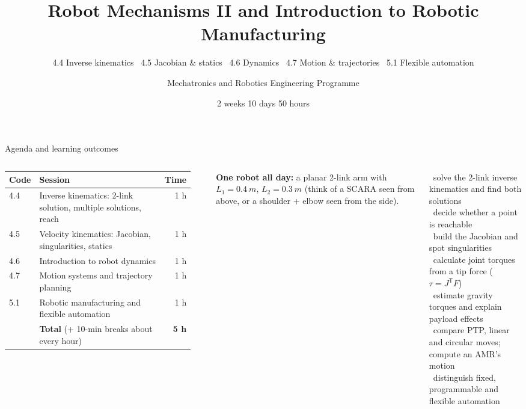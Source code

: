 \documentclass[aspectratio=169,10pt]{beamer}
\title[W2D2 -- IK, Jacobian, Dynamics, Motion, Automation]{Robot Mechanisms II and Introduction to Robotic Manufacturing}
\subtitle{4.4 Inverse kinematics \textbullet\ 4.5 Jacobian \& statics \textbullet\ 4.6 Dynamics \textbullet\ 4.7 Motion \& trajectories \textbullet\ 5.1 Flexible automation}
\author{Mechatronics and Robotics Engineering Programme}
\institute{Week 2 \textperiodcentered{} Day 2}
\date{2 weeks \textperiodcentered{} 10 days \textperiodcentered{} 50 hours}
\begin{document}
\begin{frame}[plain]\titlepage\end{frame}

\begin{frame}[t]{Agenda and learning outcomes}
\begin{columns}[T,onlytextwidth]
\footnotesize
\begin{tabularx}{\linewidth}{@{}l X r@{}}
\toprule
\textbf{Code} & \textbf{Session} & \textbf{Time}\\
\midrule
4.4 & Inverse kinematics: 2-link solution, multiple solutions, reach & 1 h\\
4.5 & Velocity kinematics: Jacobian, singularities, statics & 1 h\\
4.6 & Introduction to robot dynamics & 1 h\\
4.7 & Motion systems and trajectory planning & 1 h\\
5.1 & Robotic manufacturing and flexible automation & 1 h\\
\midrule
 & \textbf{Total} (+ 10-min breaks about every hour) & \textbf{5 h}\\
\bottomrule
\end{tabularx}\\[2mm]
\begin{notebox}
\textbf{One robot all day:} a planar 2-link arm with $L_1=\SI{0.4}{m}$, $L_2=\SI{0.3}{m}$
(think of a SCARA seen from above, or a shoulder + elbow seen from the side).
\end{notebox}
\begin{keybox}
\small
\checkitem\ solve the 2-link inverse kinematics and find both solutions\\
\checkitem\ decide whether a point is reachable\\
\checkitem\ build the Jacobian and spot singularities\\
\checkitem\ calculate joint torques from a tip force ($\tau=J^\mathsf{T}F$)\\
\checkitem\ estimate gravity torques and explain payload effects\\
\checkitem\ compare PTP, linear and circular moves; compute an AMR's motion\\
\checkitem\ distinguish fixed, programmable and flexible automation
\end{keybox}
\end{columns}
\end{frame}
\end{document}
